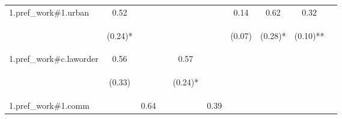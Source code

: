 \begin{center}
\begin{tabular}{lccccccccc}
\noalign{\smallskip}1.pref_work\#1.urban & 0.52 &  &  &  &  & 0.14 & 0.62 & 0.32 & \\
 & \begin{footnotesize}(0.24)*\end{footnotesize} & \begin{footnotesize}\end{footnotesize} & \begin{footnotesize}\end{footnotesize} & \begin{footnotesize}\end{footnotesize} & \begin{footnotesize}\end{footnotesize} & \begin{footnotesize}(0.07)\end{footnotesize} & \begin{footnotesize}(0.28)*\end{footnotesize} & \begin{footnotesize}(0.10)**\end{footnotesize} & \begin{footnotesize}\end{footnotesize}\\
\noalign{\smallskip}1.pref_work\#c.laworder & 0.56 &  &  & 0.57 &  &  &  &  & \\
 & \begin{footnotesize}(0.33)\end{footnotesize} & \begin{footnotesize}\end{footnotesize} & \begin{footnotesize}\end{footnotesize} & \begin{footnotesize}(0.24)*\end{footnotesize} & \begin{footnotesize}\end{footnotesize} & \begin{footnotesize}\end{footnotesize} & \begin{footnotesize}\end{footnotesize} & \begin{footnotesize}\end{footnotesize} & \begin{footnotesize}\end{footnotesize}\\
\noalign{\smallskip}1.pref_work\#1.comm &  & 0.64 &  &  & 0.39 &  &  &  & \\

\end{tabular}
\end{center}
